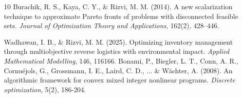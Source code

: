 \documentclass[11pt]{article}
\begin{document}
\begin{thebibliography}{10}
  Burachik, R. S., Kaya, C. Y., \& Rizvi, M. M. (2014). A new scalarization technique to approximate Pareto fronts of problems with disconnected feasible sets. \textit{Journal of Optimization Theory and Applications}, 162(2), 428--446.

 {Wadhawan, I. B., $\&$ Rizvi, M. M.} (2025). Optimizing inventory management through multiobjective reverse logistics with environmental impact. {\it Applied Mathematical Modelling}, 146, 116166.
 {Bonami, P., Biegler, L. T., Conn, A. R., Cornuéjols, G., Grossmann, I. E., Laird, C. D., ... $\&$ Wächter, A.} (2008). An algorithmic framework for convex mixed integer nonlinear programs. {\it Discrete optimization}, 5(2), 186-204.




 


\end{thebibliography}
\end{document}
